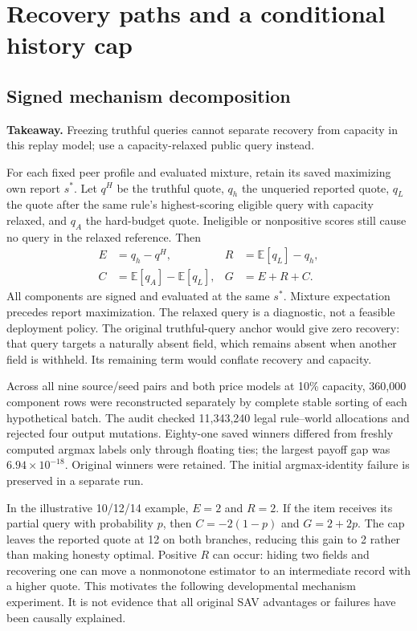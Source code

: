\documentclass[11pt]{article}
\begin{document}
\section{Recovery paths and a conditional history cap}\label{sec:recovery}
\subsection{Signed mechanism decomposition}
\noindent\textbf{Takeaway.} Freezing truthful queries cannot separate recovery
from capacity in this replay model; use a capacity-relaxed public query instead.

For each fixed peer profile and evaluated mixture, retain its saved maximizing
own report $s^*$. Let $q^H$ be the truthful quote, $q_h$ the unqueried reported
quote, $q_L$ the quote after the same rule's highest-scoring eligible query with
capacity relaxed, and $q_A$ the hard-budget quote. Ineligible or nonpositive
scores still cause no query in the relaxed reference. Then
\begin{align*}
E &= q_h-q^H, & R&=\mathbb{E}[q_L]-q_h,\\
C &=\mathbb{E}[q_A]-\mathbb{E}[q_L], & G&=E+R+C.
\end{align*}
All components are signed and evaluated at the same $s^*$. Mixture expectation
precedes report maximization. The relaxed query is a diagnostic, not a feasible
deployment policy. The original truthful-query anchor would give zero recovery:
that query targets a naturally absent field, which remains absent when another
field is withheld. Its remaining term would conflate recovery and capacity.

Across all nine source/seed pairs and both price models at 10\% capacity,
360,000 component rows were reconstructed separately by complete stable
sorting of each hypothetical batch. The audit checked 11,343,240 legal
rule--world allocations and rejected four output mutations. Eighty-one saved
winners differed from freshly computed argmax labels only through floating
ties; the largest payoff gap was $6.94\times10^{-18}$. Original winners were
retained. The initial argmax-identity failure is preserved in a separate run.

In the illustrative 10/12/14 example, $E=2$ and $R=2$. If the item receives its partial query with probability $p$, then $C=-2(1-p)$ and $G=2+2p$. The cap leaves the reported quote at 12 on both branches, reducing this gain to 2 rather than making honesty optimal. Positive $R$ can occur: hiding two fields and recovering one can move a
nonmonotone estimator to an intermediate record with a higher quote. This
motivates the following developmental mechanism experiment. It is not evidence
that all original SAV advantages or failures have been causally explained.
\end{document}
